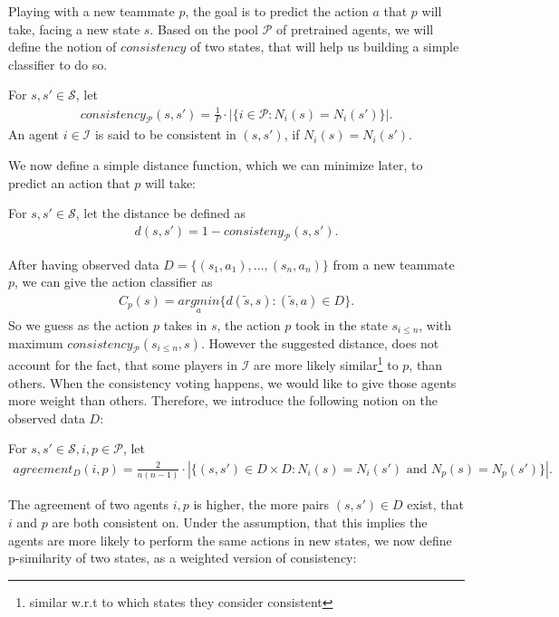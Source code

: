 \documentclass[a4paper, 11pt]{article}
\begin{document}
	
	Playing with a new teammate $p$, the goal is to predict the action $a$ that $p$ will take, facing a new state $s$. Based on the pool $\mathcal{P}$ of pretrained agents, we will define the notion of $consistency$ of two states, that will help us building a simple classifier to do so.
	\begin{Def}[consistency] {For $s,s'\in\mathcal{S}$, let  }
		\begin{align*}
		consistency_{\mathcal{P}}(s,s') = \frac{1}{P}\cdot|\{ i \in\mathcal{P}: N_i(s) = N_i(s')\}|.
		\end{align*}
		An agent $i\in\mathcal{I}$ is said to be consistent in $(s,s')$, if $N_i(s) =	 N_i(s')$.
	\end{Def}
 	We now define a simple distance function, which we can minimize later, to predict an action that $p$ will take:
	\begin{Def}[Distance] {For $s,s'\in\mathcal{S}$, let  the distance be defined as}
	\begin{align*}
	d(s, s') = 1 - consisteny_{\mathcal{P}}(s,s').
	\end{align*}
	\end{Def}
	After having observed data $D = \{(s_1, a_1),...,(s_n,a_n)\}$ from a new teammate $p$, we can give the action classifier as 
	\begin{align*}
	C_p(s) = \underset{a}{argmin} \{ d(\tilde{s}, s): (\tilde{s}, a)\in D \}.
	\end{align*}
	So we guess as the action $p$ takes in $s$, the action $p$ took in the state $s_{i\leq n}$,  with maximum $consistency_{\mathcal{P}}(s_{i\leq n}, s)$. However the suggested distance, does not account for the fact, that some players in $\mathcal{I}$ are more likely similar\footnote{similar w.r.t to which states they consider consistent} to $p$, than others. When the consistency voting happens, we would like to give those agents more weight than others. Therefore, we introduce the following notion on the observed data $D$:
	\begin{Def}[agreement] {For $s,s'\in\mathcal{S}, i,p\in\mathcal{P}$, let  }
		\begin{align*}
		agreement_D(i,p) =  \frac{2}{n(n-1)}\cdot|\{ (s,s')\in D\times D: N_i(s) = N_i(s') \text{ and } N_p(s) = N_p(s')\}|.
		\end{align*}
	\end{Def}
	The agreement of two agents $i,p$ is higher, the more pairs $(s,s')\in D$ exist, that $i$ and $p$ are both consistent on. Under the assumption, that this implies the agents are more likely to perform the same actions in new states, we now define p-similarity of two states, as a weighted version of consistency:
	
\end{document}
